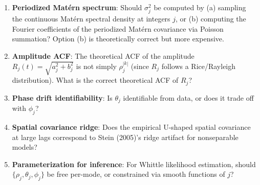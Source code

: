 \documentclass[12pt]{article}
\begin{document}
\begin{enumerate}[label=\textbf{Q\arabic*.}]
  \item \textbf{Periodized Mat\'{e}rn spectrum}: Should $\sigma_j^2$ be computed by (a) sampling the continuous Mat\'{e}rn spectral density at integers $j$, or (b) computing the Fourier coefficients of the periodized Mat\'{e}rn covariance via Poisson summation? Option (b) is theoretically correct but more expensive.
  \item \textbf{Amplitude ACF}: The theoretical ACF of the amplitude $R_j(t) = \sqrt{a_j^2 + b_j^2}$ is not simply $\rho_j^{|k|}$ (since $R_j$ follows a Rice/Rayleigh distribution). What is the correct theoretical ACF of $R_j$?
  \item \textbf{Phase drift identifiability}: Is $\theta_j$ identifiable from data, or does it trade off with $\phi_j$?
  \item \textbf{Spatial covariance ridge}: Does the empirical U-shaped spatial covariance at large lags correspond to Stein (2005)'s ridge artifact for nonseparable models?
  \item \textbf{Parameterization for inference}: For Whittle likelihood estimation, should $\{\rho_j, \theta_j, \phi_j\}$ be free per-mode, or constrained via smooth functions of $j$?
\end{enumerate}
\end{document}
